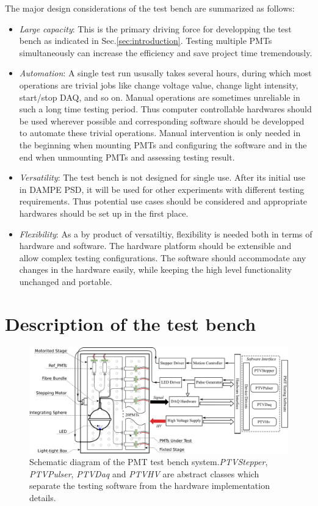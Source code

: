 \documentclass[5p, times]{elsarticle}
\begin{document}
The major design considerations of the test bench are summarized as follows:
\begin{itemize}
 \item \textit{Large capacity}: This is the primary driving force for developping the test bench as indicated in Sec.\ref{sec:introduction}.
 Testing multiple PMTs simultaneously can increase the efficiency and save project time tremendously. 
 \item \textit{Automation}: A single test run ususally takes several hours,  during which most operations are trivial jobs like change voltage value, change light intensity, start/stop DAQ, and so on.
 Manual operations are sometimes unreliable in such a long time testing period.
 Thus computer controllable hardwares should be used wherever possible and corresponding software should be developped to automate these trivial operations.
 Manual intervention is only needed in the beginning when mounting PMTs and configuring the software and in the end when unmounting PMTs and assessing testing result. 
 \item \textit{Versatility}: The test bench is not designed for single use.
 After its initial use in DAMPE PSD, it will be used for other experiments with different testing requirements.
 T\-h\-u\-s potential use cases should be considered and appropriate hardwares should be set up in the first place.
 \item \textit{Flexibility}: As a by product of versatiltiy, flexibility is needed both in terms of hardware and software.
 The hardware platform should be extensible and allow complex testing configurations.
 The software should accommodate any changes in the hardware easily, while keeping the high level functionality unchanged and portable. 
\end{itemize}

\section{Description of the test bench}
\label{sec:description}

\begin{figure}[t]
 \centering
 \includegraphics[width=140mm]{testbench_overview}
\caption{Schematic diagram of the PMT test bench system.\textit{PTVStepper}, \textit{PTVPulser}, \textit{PTVDaq} and \textit{PTVHV} are abstract classes which separate the testing software from the hardware implementation details.}
\label{fig:testbench_overveiw}
\end{figure}
\end{document}

